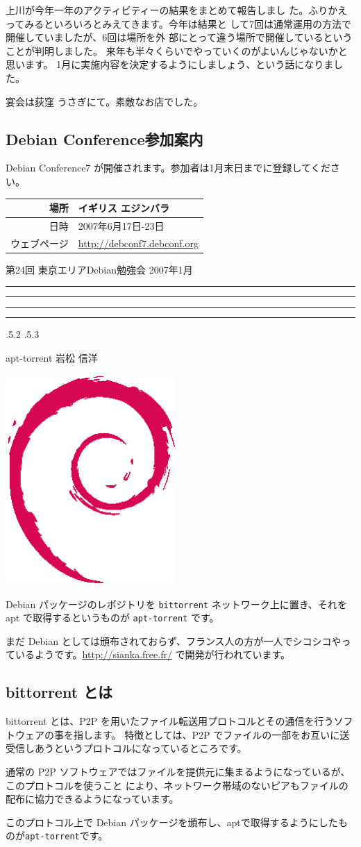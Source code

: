 \documentclass[mingoth,a4paper,twoside]{jsarticle}
\makeatletter
\newcommand{\debmtgyear}{2007}
\newcommand{\debmtgmonth}{1}
\newcommand{\debmtgnumber}{24}
\renewcommand{\section}{\@startsection{section}{1}{\z@}%
    {\Cvs \@plus.5\Cdp \@minus.2\Cdp}%
    {.5\Cvs \@plus.3\Cdp}%
    {\normalfont\gt\fontsize{32}{32}\headfont\raggedright}} %
\newcommand{\dancersection}[2]{%
\newpage
第\debmtgnumber{}回 東京エリアDebian勉強会 \debmtgyear{}年\debmtgmonth{}月
\hrule
\vspace{0.5mm}
\hrule
%
\vspace{4cm}
\hrule
\vspace{0.5mm}
\hrule
%
\vspace{-7cm}
\begin{minipage}[b]{0.7\hsize}
\section{#1}
\hfill{}#2\\
\vspace{2cm}
\end{minipage}
\begin{minipage}[b]{0.3\hsize}
\hfill{}\includegraphics[height=8cm]{image200502/openlogo-nd.eps}\\
\end{minipage}
%
\vspace{-1cm}
}
\makeatother
\begin{document}
	  
	    上川が今年一年のアクティビティーの結果をまとめて報告しまし
	    た。ふりかえってみるといろいろとみえてきます。今年は結果と
	    して7回は通常運用の方法で開催していましたが、6回は場所を外
	    部にとって違う場所で開催しているということが判明しました。
	    来年も半々くらいでやっていくのがよいんじゃないかと思います。
	    1月に実施内容を決定するようにしましょう、という話になりました。
	  
	  
	    宴会は荻窪 うさぎにて。素敵なお店でした。


\subsection{Debian Conference参加案内}

Debian Conference7 が開催されます。参加者は1月末日までに登録してください。

\begin{tabular}[t]{|r|l|}
\hline
場所 & イギリス エジンバラ \\
\hline
日時 & 2007年6月17日-23日\\
\hline
 ウェブページ & \url{http://debconf7.debconf.org}\\
\hline
\end{tabular}



\dancersection{apt-torrent}{岩松 信洋}
\label{sec:apt-torrnet}

Debian パッケージのレポジトリを \texttt{bittorrent} ネットワーク上に置き、それを apt で取得するというものが \texttt{apt-torrent} です。

まだ Debian としては頒布されておらず、フランス人の方が一人でシコシコやっているようです。\url{http://sianka.free.fr/} で開発が行われています。

\subsection{bittorrent とは}
bittorrent とは、P2P を用いたファイル転送用プロトコルとその通信を行うソフトウェアの事を指します。
特徴としては、P2P でファイルの一部をお互いに送受信しあうというプロトコルになっているところです。

通常の P2P ソフトウェアではファイルを提供元に集まるようになっているが、このプロトコルを使うこと
により、ネットワーク帯域のないピアもファイルの配布に協力できるようになっています。

このプロトコル上で Debian パッケージを頒布し、aptで取得するようにしたものが\texttt{apt-torrent}です。
\end{document}
